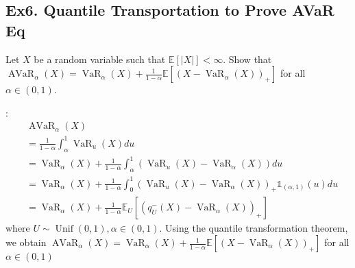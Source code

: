 \subsection*{Ex6. Quantile Transportation to Prove AVaR Eq}
Let $X$ be a random variable such that $\mathbb{E}[|X|]<\infty$. Show that
$
\operatorname{AVaR}_{\alpha}(X)=\operatorname{VaR}_{\alpha}(X)+\frac{1}{1-\alpha} \mathbb{E}\left[\left(X-\operatorname{VaR}_{\alpha}(X)\right)_{+}\right]
$
for all $\alpha \in(0,1)$.


: 
$$\begin{aligned} 
&\operatorname{AVaR}_{\alpha}(X) \\
&=\frac{1}{1-\alpha} \int_{\alpha}^{1} \operatorname{VaR}_{u}(X) d u\\
&=\operatorname{VaR}_{\alpha}(X)+\frac{1}{1-\alpha} \int_{\alpha}^{1}\left(\operatorname{VaR}_{u}(X)-\operatorname{VaR}_{\alpha}(X)\right) d u \\ &=\operatorname{VaR}_{\alpha}(X)+\frac{1}{1-\alpha} \int_{0}^{1}\left(\operatorname{VaR}_{u}(X)-\operatorname{VaR}_{\alpha}(X)\right)_{+} \mathbb{1}_{(\alpha, 1)}(u) d u \\ &=\operatorname{VaR}_{\alpha}(X)+\frac{1}{1-\alpha} \mathbb{E}_{U}\left[\left(q_{U}^{-}(X)-\operatorname{VaR}_{\alpha}(X)\right)_{+}\right] \end{aligned}$$ where $U \sim \operatorname{Unif}(0,1), \alpha \in(0,1)$. Using the quantile transformation theorem, we obtain
$
\operatorname{AVaR}_{\alpha}(X)=\operatorname{VaR}_{\alpha}(X)+\frac{1}{1-\alpha} \mathbb{E}\left[\left(X-\operatorname{VaR}_{\alpha}(X)\right)_{+}\right]
$
for all $\alpha \in(0,1)$